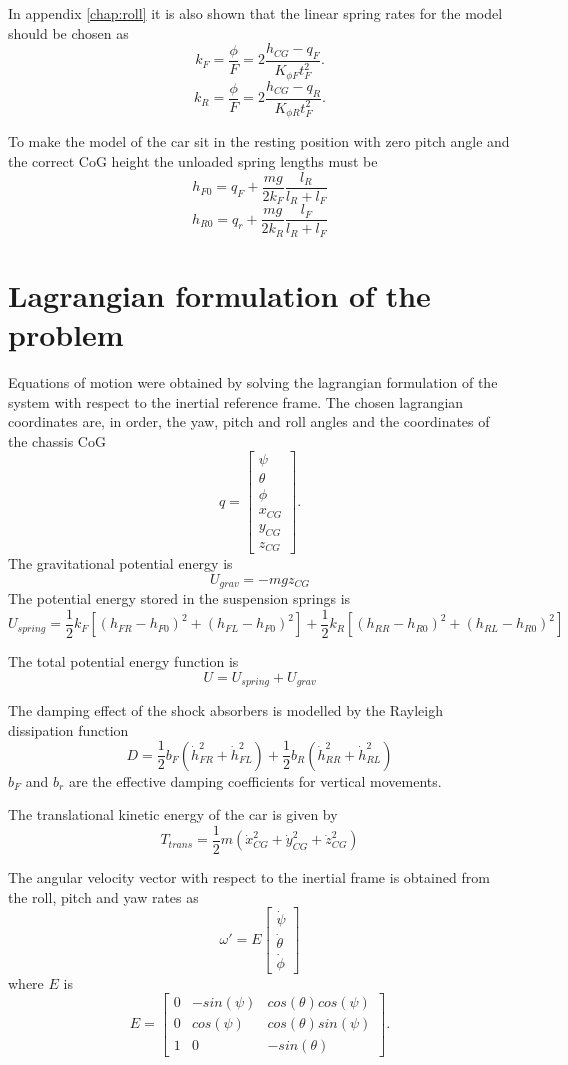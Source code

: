 In appendix \ref{chap:roll} it is also shown that the linear spring rates for the model should be chosen as
$$
k_F = \frac{\phi}{F} = 2\frac{h_{CG}-q_F}{K_{\phi F} t_F^2}.
$$
$$
k_R = \frac{\phi}{F} = 2\frac{h_{CG}-q_R}{K_{\phi R} t_F^2}.
$$

To make the model of the car sit in the resting position with zero pitch angle and the correct CoG height the unloaded spring lengths must be
$$ h_{F0} = q_F + \frac{mg}{2k_F}\frac{l_R}{l_R+l_F} $$
$$ h_{R0} = q_r + \frac{mg}{2k_R}\frac{l_F}{l_R+l_F} $$

\section{Lagrangian formulation of the problem}
\label{sec:6doflag}
Equations of motion were obtained by solving the lagrangian formulation of the system with respect to the inertial reference frame.
The chosen lagrangian coordinates are, in order, the yaw, pitch and roll angles and the coordinates of the chassis CoG
$$
q = \begin{bmatrix}
\psi \\
\theta \\
\phi \\
x_{CG} \\
y_{CG} \\
z_{CG}
\end{bmatrix}.
$$
The gravitational potential energy is
$$U_{grav} = -mgz_{CG}$$
The potential energy stored in the suspension springs is
$$ U_{spring} = \frac{1}{2} k_F [(h_{FR} - h_{F0})^2 + (h_{FL} - h_{F0})^2] +  \frac{1}{2} k_R [(h_{RR} - h_{R0})^2 + (h_{RL} - h_{R0})^2] $$

The total potential energy function is
$$ U = U_{spring} + U_{grav} $$

The damping effect of the shock absorbers is modelled by the Rayleigh dissipation function
$$ D = \frac{1}{2} b_F (\dot h_{FR}^2 + \dot h_{FL}^2) + \frac{1}{2} b_R (\dot h_{RR}^2 + \dot h_{RL}^2) $$
$b_F$ and $b_r$ are the effective damping coefficients for vertical movements.

The translational kinetic energy of the car is given by
$$ T_{trans} = \frac{1}{2} m (\dot x_{CG}^2 +\dot y_{CG}^2 +\dot z_{CG}^2 ) $$


The angular velocity vector with respect to the inertial frame is obtained from the roll, pitch and yaw rates as
$$
\omega' = E\begin{bmatrix}
\dot\psi \\
\dot\theta \\
\dot\phi
\end{bmatrix}
$$
where $E$ is
$$
E=\begin{bmatrix}
0 & -sin(\psi)      & cos(\theta)cos(\psi)\\
0      & cos(\psi) &  cos(\theta)sin(\psi) \\
1 & 0      & -sin(\theta)
\end{bmatrix}.
$$


